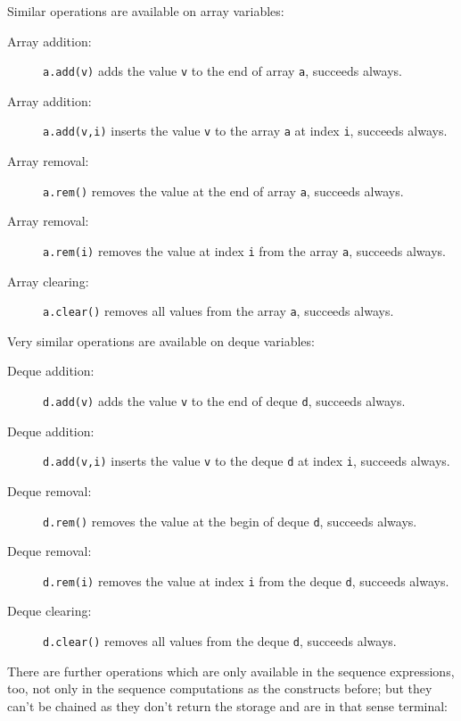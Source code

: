 \noindent Similar operations are available on array variables:

\begin{description}
\item[Array addition:] \texttt{a.add(v)} adds the value \texttt{v} to the end of array \texttt{a}, succeeds always.
\item[Array addition:] \texttt{a.add(v,i)} inserts the value \texttt{v} to the array \texttt{a} at index \texttt{i}, succeeds always.
\item[Array removal:] \texttt{a.rem()} removes the value at the end of array \texttt{a}, succeeds always.
\item[Array removal:] \texttt{a.rem(i)} removes the value at index \texttt{i} from the array \texttt{a}, succeeds always.
\item[Array clearing:] \texttt{a.clear()} removes all values from the array \texttt{a}, succeeds always.
\end{description}

\noindent Very similar operations are available on deque variables:

\begin{description}
\item[Deque addition:] \texttt{d.add(v)} adds the value \texttt{v} to the end of deque \texttt{d}, succeeds always.
\item[Deque addition:] \texttt{d.add(v,i)} inserts the value \texttt{v} to the deque \texttt{d} at index \texttt{i}, succeeds always.
\item[Deque removal:] \texttt{d.rem()} removes the value at the begin of deque \texttt{d}, succeeds always.
\item[Deque removal:] \texttt{d.rem(i)} removes the value at index \texttt{i} from the deque \texttt{d}, succeeds always.
\item[Deque clearing:] \texttt{d.clear()} removes all values from the deque \texttt{d}, succeeds always.
\end{description}

\noindent There are further operations which are only available in the sequence expressions, too, not only in the sequence computations as the constructs before; but they can't be chained as they don't return the storage and are in that sense terminal:

